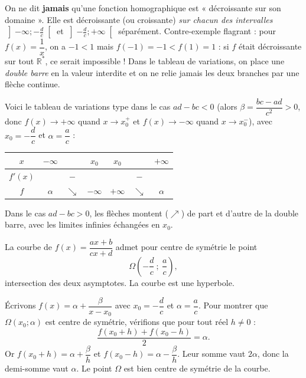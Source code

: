 \documentclass[11pt]{article}
\newcommand{\cle}[1]{{\popxbold\color{popdark}#1}}
\newcounter{popsec}
\newcounter{popsub}
\newcommand{\courssub}[1]{%
  \stepcounter{popsub}%
  \par\vspace{9pt}\noindent{\popxbold\fontsize{11.5}{13}\selectfont\color{popink}{\color{poporange}\thepopsec.\thepopsub}\hspace{6pt}#1}\par\nopagebreak\vspace{4pt}
}
\begin{document}
\begin{attention}
On ne dit \textbf{jamais} qu'une fonction homographique est « décroissante sur son domaine ». Elle est décroissante (ou croissante) \emph{sur chacun des intervalles} $\left]-\infty ; -\frac{d}{c}\right[$ et $\left]-\frac{d}{c} ; +\infty\right[$ séparément. Contre-exemple flagrant : pour $f(x) = \dfrac{1}{x}$, on a $-1 < 1$ mais $f(-1) = -1 < f(1) = 1$ : si $f$ était décroissante sur tout $\mathbb{R}^*$, ce serait impossible ! Dans le tableau de variations, on place une \emph{double barre} en la valeur interdite et on ne relie jamais les deux branches par une flèche continue.
\end{attention}

Voici le tableau de variations type dans le cas $ad - bc < 0$ (alors $\beta = \dfrac{bc-ad}{c^2} > 0$, donc $f(x) \to +\infty$ quand $x \to x_0^+$ et $f(x) \to -\infty$ quand $x \to x_0^-$), avec $x_0 = -\dfrac{d}{c}$ et $\alpha = \dfrac{a}{c}$ :

\begin{center}
\begin{tabular}{|c|ccc||ccc|}\hline
$x$ & $-\infty$ & & $x_0$ & $x_0$ & & $+\infty$ \\ \hline
$f'(x)$ & & $-$ & & & $-$ & \\ \hline
$f$ & $\alpha$ & $\searrow$ & $-\infty$ & $+\infty$ & $\searrow$ & $\alpha$ \\ \hline
\end{tabular}
\end{center}

Dans le cas $ad - bc > 0$, les flèches montent ($\nearrow$) de part et d'autre de la double barre, avec les limites infinies échangées en $x_0$.

\courssub{Centre de symétrie}

\begin{propriete}
La courbe de $f(x) = \dfrac{ax+b}{cx+d}$ admet pour \cle{centre de symétrie} le point
\[ \Omega\left(-\frac{d}{c} \ ;\ \frac{a}{c}\right), \]
intersection des deux asymptotes. La courbe est une \cle{hyperbole}.
\end{propriete}

\begin{experience}
Écrivons $f(x) = \alpha + \dfrac{\beta}{x - x_0}$ avec $x_0 = -\dfrac{d}{c}$ et $\alpha = \dfrac{a}{c}$. Pour montrer que $\Omega(x_0 ; \alpha)$ est centre de symétrie, vérifions que pour tout réel $h \neq 0$ :
\[ \frac{f(x_0 + h) + f(x_0 - h)}{2} = \alpha. \]
Or $f(x_0 + h) = \alpha + \dfrac{\beta}{h}$ et $f(x_0 - h) = \alpha - \dfrac{\beta}{h}$. Leur somme vaut $2\alpha$, donc la demi-somme vaut $\alpha$. Le point $\Omega$ est bien centre de symétrie de la courbe.
\end{experience}
\end{document}
